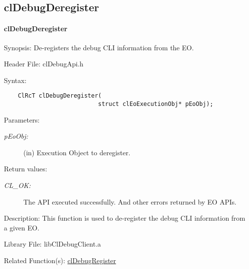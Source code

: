 \subsection{clDebugDeregister}
\hypertarget{pagedbg105}{}\paragraph{cl\-Debug\-Deregister}\label{pagedbg105}
\begin{Desc}
\item[Synopsis:]De-registers the debug CLI information from the EO.\end{Desc}
\begin{Desc}
\item[Header File:]clDebugApi.h\end{Desc}
\begin{Desc}
\item[Syntax:]

\footnotesize\begin{verbatim}    ClRcT clDebugDeregister(
                           struct clEoExecutionObj* pEoObj);
\end{verbatim}
\normalsize
\end{Desc}
\begin{Desc}
\item[Parameters:]
\begin{description}
\item[{\em p\-Eo\-Obj:}](in) Execution Object to deregister.\end{description}
\end{Desc}
\begin{Desc}
\item[Return values:]
\begin{description}
\item[{\em CL\_\-OK:}]The API executed successfully. And other errors returned by EO APIs.\end{description}
\end{Desc}
\begin{Desc}
\item[Description:]This function is used to de-register the debug CLI information from a given EO.\end{Desc}
\begin{Desc}
\item[Library File:]lib\-Cl\-Debug\-Client.a\end{Desc}
\begin{Desc}
\item[Related Function(s):]\hyperlink{pagedbg104}{cl\-Debug\-Register} \end{Desc}
\newpage


